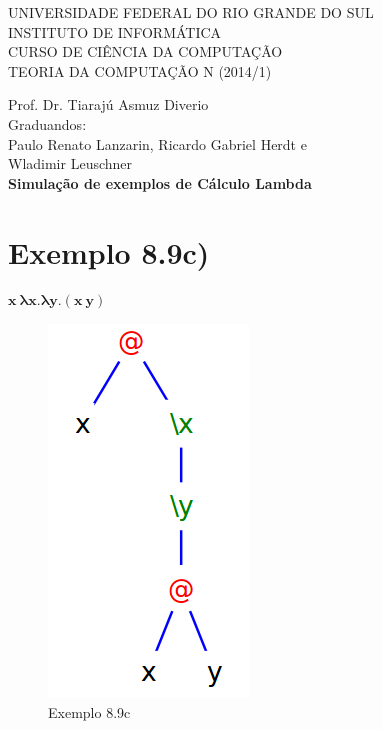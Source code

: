 \documentclass[a4paper]{article}
\begin{document}
\begin{center}


\large{ 
\uppercase{ Universidade Federal do Rio Grande do Sul\\

Instituto de Informática \\

Curso de Ciência da Computação \\

Teoria da Computação N (2014/1)\\
}

Prof. Dr. Tiarajú Asmuz Diverio \\


Graduandos: \\ Paulo Renato Lanzarin, Ricardo Gabriel Herdt e \\
	Wladimir Leuschner \\[1.5cm]



\LARGE {\bfseries Simulação de exemplos de Cálculo Lambda \\[1.0cm]
}}

\end{center}

\section*{Exemplo 8.9c)}

$\mathbf{x\ \lambda x.\lambda y.(x\ y)}$

\begin{figure}[h]
  \centering
  \includegraphics[scale=0.5]{8-9e.png}
  \caption{Exemplo 8.9c}
\end{figure}
\end{document}
